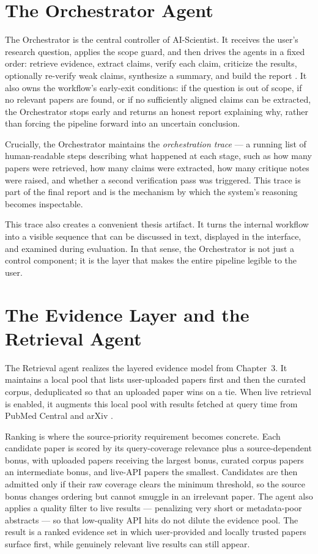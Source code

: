 \section{The Orchestrator Agent }

The Orchestrator is the central controller of AI-Scientist. It receives the user's research question, applies the
scope guard, and then drives the agents in a fixed order: retrieve evidence, extract claims, verify each claim,
criticize the results, optionally re-verify weak claims, synthesize a summary, and build the report \cite{langgraph2024,wu2023autogen}.
It also owns
the workflow's early-exit conditions: if the question is out of scope, if no relevant papers are found, or if no
sufficiently aligned claims can be extracted, the Orchestrator stops early and returns an honest report explaining
why, rather than forcing the pipeline forward into an uncertain conclusion.

Crucially, the Orchestrator maintains the \emph{orchestration trace} --- a running list of human-readable steps
describing what happened at each stage, such as how many papers were retrieved, how many claims were extracted,
how many critique notes were raised, and whether a second verification pass was triggered. This trace is part of
the final report and is the mechanism by which the system's reasoning becomes inspectable.

This trace also creates a convenient thesis artifact. It turns the internal workflow into a visible sequence that
can be discussed in text, displayed in the interface, and examined during evaluation. In that sense, the
Orchestrator is not just a control component; it is the layer that makes the entire pipeline legible to the user.

\section{The Evidence Layer and the Retrieval Agent }

The Retrieval agent realizes the layered evidence model from Chapter~3. It maintains a local pool that lists
user-uploaded papers first and then the curated corpus, deduplicated so that an uploaded paper wins on a tie. When
live retrieval is enabled, it augments this local pool with results fetched at query time from PubMed Central and
arXiv \cite{lewis2020rag,guu2020realm,karpukhin2020dpr,khattab2020colbert}.

Ranking is where the source-priority requirement becomes concrete. Each candidate paper is scored by its
query-coverage relevance plus a source-dependent bonus, with uploaded papers receiving the largest bonus, curated
corpus papers an intermediate bonus, and live-API papers the smallest. Candidates are then admitted only if their
raw coverage clears the minimum threshold, so the source bonus changes ordering but cannot smuggle in an
irrelevant paper. The agent also applies a quality filter to live results --- penalizing very short or metadata-poor
abstracts --- so that low-quality API hits do not dilute the evidence pool. The result is a ranked evidence set in
which user-provided and locally trusted papers surface first, while genuinely relevant live results can still
appear.

